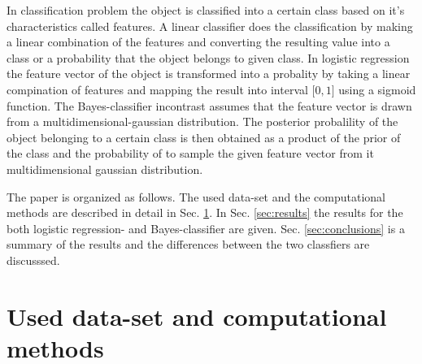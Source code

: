 \documentclass[aps,prb,10pt,twocolumn,groupedaddress]{revtex4-1}
\begin{document}
In classification problem the object is classified into a certain class based
on it's characteristics called features. A linear classifier does the
classification by making a linear combination of the features and converting
the resulting value into a class or a probability that the object belongs to
given class. In logistic regression the feature vector of the object is
transformed into a probality by taking a linear compination of features and
mapping the result into interval $\lbrack 0, 1\rbrack$ using a sigmoid function.
The Bayes-classifier incontrast assumes that the feature vector is drawn from a
multidimensional-gaussian distribution. The posterior probalility of the object
belonging to a certain class is then obtained as a product of the prior of the
class and the probability of to sample the given feature vector from it
multidimensional gaussian distribution.

The paper is organized as follows. The used data-set and the computational
methods are described in detail in Sec. \ref{sec:methods}. In Sec.
\ref{sec:results} the results for the both logistic regression- and
Bayes-classifier are given. Sec. \ref{sec:conclusions} is a
summary of the results and the differences between the two classfiers are
discusssed.

\section{Used data-set and computational methods}
\label{sec:methods}
\end{document}
